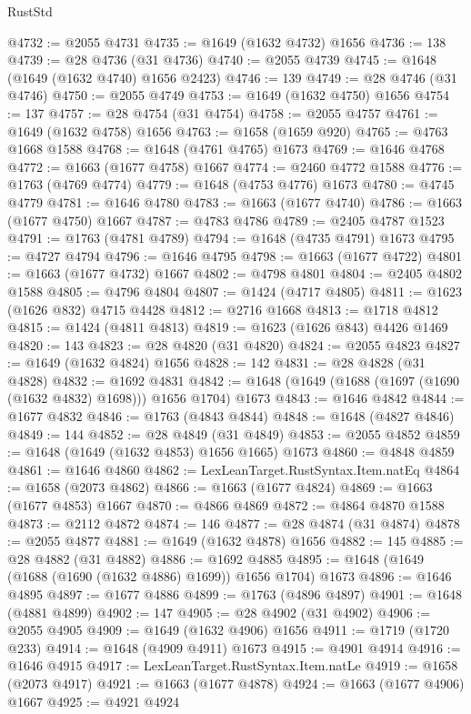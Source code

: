 \begin{lexlean}{RustStd}
\begin{coremodule}
@4732 := @2055 @4731
@4735 := @1649 (@1632 @4732) @1656
@4736 := 138
@4739 := @28 @4736 (@31 @4736)
@4740 := @2055 @4739
@4745 := @1648 (@1649 (@1632 @4740) @1656 @2423)
@4746 := 139
@4749 := @28 @4746 (@31 @4746)
@4750 := @2055 @4749
@4753 := @1649 (@1632 @4750) @1656
@4754 := 137
@4757 := @28 @4754 (@31 @4754)
@4758 := @2055 @4757
@4761 := @1649 (@1632 @4758) @1656
@4763 := @1658 (@1659 @920)
@4765 := @4763 @1668 @1588
@4768 := @1648 (@4761 @4765) @1673
@4769 := @1646 @4768
@4772 := @1663 (@1677 @4758) @1667
@4774 := @2460 @4772 @1588
@4776 := @1763 (@4769 @4774)
@4779 := @1648 (@4753 @4776) @1673
@4780 := @4745 @4779
@4781 := @1646 @4780
@4783 := @1663 (@1677 @4740)
@4786 := @1663 (@1677 @4750) @1667
@4787 := @4783 @4786
@4789 := @2405 @4787 @1523
@4791 := @1763 (@4781 @4789)
@4794 := @1648 (@4735 @4791) @1673
@4795 := @4727 @4794
@4796 := @1646 @4795
@4798 := @1663 (@1677 @4722)
@4801 := @1663 (@1677 @4732) @1667
@4802 := @4798 @4801
@4804 := @2405 @4802 @1588
@4805 := @4796 @4804
@4807 := @1424 (@4717 @4805)
@4811 := @1623 (@1626 @832) @4715 @4428
@4812 := @2716 @1668
@4813 := @1718 @4812
@4815 := @1424 (@4811 @4813)
@4819 := @1623 (@1626 @843) @4426 @1469
@4820 := 143
@4823 := @28 @4820 (@31 @4820)
@4824 := @2055 @4823
@4827 := @1649 (@1632 @4824) @1656
@4828 := 142
@4831 := @28 @4828 (@31 @4828)
@4832 := @1692 @4831
@4842 := @1648 (@1649 (@1688 (@1697 (@1690 (@1632 @4832) @1698))) @1656 @1704) @1673
@4843 := @1646 @4842
@4844 := @1677 @4832
@4846 := @1763 (@4843 @4844)
@4848 := @1648 (@4827 @4846)
@4849 := 144
@4852 := @28 @4849 (@31 @4849)
@4853 := @2055 @4852
@4859 := @1648 (@1649 (@1632 @4853) @1656 @1665) @1673
@4860 := @4848 @4859
@4861 := @1646 @4860
@4862 := LexLeanTarget.RustSyntax.Item.natEq
@4864 := @1658 (@2073 @4862)
@4866 := @1663 (@1677 @4824)
@4869 := @1663 (@1677 @4853) @1667
@4870 := @4866 @4869
@4872 := @4864 @4870 @1588
@4873 := @2112 @4872
@4874 := 146
@4877 := @28 @4874 (@31 @4874)
@4878 := @2055 @4877
@4881 := @1649 (@1632 @4878) @1656
@4882 := 145
@4885 := @28 @4882 (@31 @4882)
@4886 := @1692 @4885
@4895 := @1648 (@1649 (@1688 (@1690 (@1632 @4886) @1699)) @1656 @1704) @1673
@4896 := @1646 @4895
@4897 := @1677 @4886
@4899 := @1763 (@4896 @4897)
@4901 := @1648 (@4881 @4899)
@4902 := 147
@4905 := @28 @4902 (@31 @4902)
@4906 := @2055 @4905
@4909 := @1649 (@1632 @4906) @1656
@4911 := @1719 (@1720 @233)
@4914 := @1648 (@4909 @4911) @1673
@4915 := @4901 @4914
@4916 := @1646 @4915
@4917 := LexLeanTarget.RustSyntax.Item.natLe
@4919 := @1658 (@2073 @4917)
@4921 := @1663 (@1677 @4878)
@4924 := @1663 (@1677 @4906) @1667
@4925 := @4921 @4924

\end{coremodule}
\end{lexlean}
